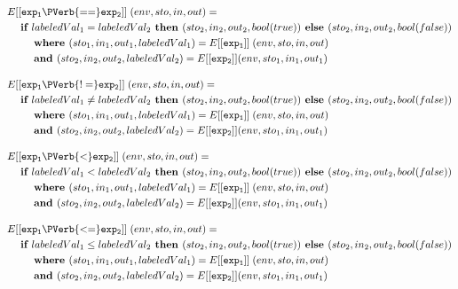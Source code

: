 \documentclass[12pt]{article}
\begin{document}
\begin{align*}
&E[[{\tt exp_1 \PVerb{ == } exp_2}]]\; (env,sto,in,out) = \\ 
&\hspace{3ex}\textbf{if } labeledVal_1 = labeledVal_2 \textbf{ then } (sto_2,in_2,out_2,bool(true)) \textbf{ else } (sto_2,in_2,out_2,bool(false)) \\
&\hspace{6ex}\textbf{where } (sto_1,in_1,out_1,labeledVal_1) = E[[{\tt exp_1}]]\;(env,sto,in,out) \\
&\hspace{6ex}\textbf{and }(sto_2,in_2,out_2,labeledVal_2) = E[[{\tt exp_2}]] (env,sto_1,in_1,out_1) \\
\end{align*}

\begin{align*}
&E[[{\tt exp_1 \PVerb{ != } exp_2}]]\; (env,sto,in,out) = \\ 
&\hspace{3ex}\textbf{if } labeledVal_1 \neq labeledVal_2 \textbf{ then } (sto_2,in_2,out_2,bool(true)) \textbf{ else } (sto_2,in_2,out_2,bool(false)) \\
&\hspace{6ex}\textbf{where } (sto_1,in_1,out_1,labeledVal_1) = E[[{\tt exp_1}]]\;(env,sto,in,out) \\
&\hspace{6ex}\textbf{and }(sto_2,in_2,out_2,labeledVal_2) = E[[{\tt exp_2}]] (env,sto_1,in_1,out_1) \\
\end{align*}

\begin{align*}
&E[[{\tt exp_1 \PVerb{ < } exp_2}]]\; (env,sto,in,out) = \\ 
&\hspace{3ex}\textbf{if } labeledVal_1 < labeledVal_2 \textbf{ then } (sto_2,in_2,out_2,bool(true)) \textbf{ else } (sto_2,in_2,out_2,bool(false)) \\
&\hspace{6ex}\textbf{where } (sto_1,in_1,out_1,labeledVal_1) = E[[{\tt exp_1}]]\;(env,sto,in,out) \\
&\hspace{6ex}\textbf{and }(sto_2,in_2,out_2,labeledVal_2) = E[[{\tt exp_2}]] (env,sto_1,in_1,out_1) \\
\end{align*}

\begin{align*}
&E[[{\tt exp_1 \PVerb{ <= } exp_2}]]\; (env,sto,in,out) = \\ 
&\hspace{3ex}\textbf{if } labeledVal_1 \leq labeledVal_2 \textbf{ then } (sto_2,in_2,out_2,bool(true)) \textbf{ else } (sto_2,in_2,out_2,bool(false)) \\
&\hspace{6ex}\textbf{where } (sto_1,in_1,out_1,labeledVal_1) = E[[{\tt exp_1}]]\;(env,sto,in,out) \\
&\hspace{6ex}\textbf{and }(sto_2,in_2,out_2,labeledVal_2) = E[[{\tt exp_2}]] (env,sto_1,in_1,out_1) \\
\end{align*}
\end{document}
